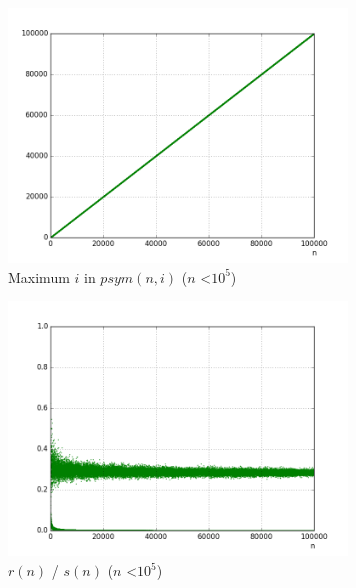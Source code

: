 \documentclass[10pt,twocolumn]{article}
\begin{document}
\begin{figure}[!ht]
\centering
\includegraphics[width=9cm]{f_checkpoint_gap_max_index_sym_primes}
\caption{Maximum $i$ in $psym(n,i)$ ($n$ \textless $10^5$)}
\label{fig:maxsymprimeindex}
\end{figure}

\begin{figure}[!ht]
\centering
\includegraphics[width=9cm]{f_checkpoint_gap_ratio_to_goldbach}
\caption{$r(n)$ / $s(n)$ ($n$ \textless $10^5$)}
\label{fig:gptosymp}
\end{figure}
\end{document}
